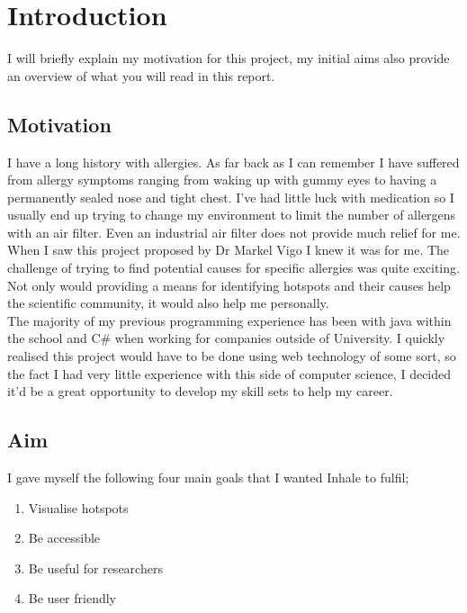 \chapter{Introduction}
\label{cha:intro}

I will briefly explain my motivation for this project, my initial aims also provide an overview of what you will read in this report.

\section{Motivation} 
I have a long history with allergies. As far back as I can remember I have suffered from allergy symptoms ranging from waking up with gummy eyes to having a permanently sealed nose and tight chest. I've had little luck with medication so I usually end up trying to change my environment to limit the number of allergens with an air filter. Even an industrial air filter does not provide much relief for me.\\

When I saw this project proposed by Dr Markel Vigo I knew it was for me. The challenge of trying to find potential causes for specific allergies was quite exciting. Not only would providing a means for identifying hotspots and their causes help the scientific community, it would also help me personally.\\

The majority of my previous programming experience has been with java within the school and C\# when working for companies outside of University. I quickly realised this project would have to be done using web technology of some sort, so the fact I had very little experience with this side of computer science, I decided it'd be a great opportunity to develop my skill sets to help my career.\\

\section{Aim}
\label{sec:aim}

I gave myself the following four main goals that I wanted Inhale to fulfil;

\begin{enumerate}
  \item Visualise hotspots
  \item Be accessible
  \item Be useful for researchers
  \item Be user friendly
\end{enumerate}


